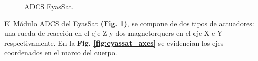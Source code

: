 
\begin{figure}[h]
	\centering
	\caption{ADCS EyasSat.}
	\label{fig:ADCS_eyassat}
\end{figure}

El Módulo ADCS del EyasSat \textbf{(Fig. \ref{fig:ADCS_eyassat})}, se compone de dos tipos de actuadores: una rueda de reacción en el eje Z y dos magnetorquers en el eje X e Y respectivamente. En la \textbf{Fig. \ref{fig:eyassat_axes}} se evidencian los ejes coordenados en el marco del cuerpo.


